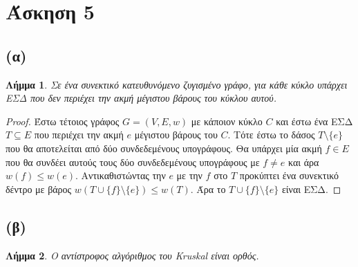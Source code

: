 \documentclass[11pt,a4paper,oneside]{report}
\newtheorem*{lemma}{Λήμμα}
\begin{document}
\section*{Άσκηση 5}
\subsection*{(α)}
\begin{lemma}
Σε ένα συνεκτικό κατευθυνόμενο ζυγισμένο γράφο, για κάθε κύκλο υπάρχει ΕΣΔ που δεν περιέχει την ακμή μέγιστου βάρους του κύκλου αυτού.
\end{lemma}

\begin{proof}
Έστω τέτοιος γράφος $G = (V, E, w)$ με κάποιον κύκλο $C$ και έστω ένα ΕΣΔ $T \subseteq E$ που περιέχει την ακμή $e$ μέγιστου βάρους του $C$. Τότε έστω το δάσος $T \setminus \{ e \}$ που θα αποτελείται από δύο συνδεδεμένους υπογράφους. Θα υπάρχει μία ακμή $f \in E$ που θα συνδέει αυτούς τους δύο συνδεδεμένους υπογράφους με $f \neq e$ και άρα $w( f ) \leq w( e )$. Αντικαθιστώντας την $e$ με την $f$ στο $T$ προκύπτει ένα συνεκτικό δέντρο με βάρος $w( T \cup \{ f \} \setminus \{ e \} ) \leq w( T )$. Άρα το $T \cup \{ f \} \setminus \{ e \}$ είναι ΕΣΔ.
\end{proof}

\subsection*{(β)}
\begin{lemma}
Ο αντίστροφος αλγόριθμος του \textlatin{Kruskal} είναι ορθός.
\end{lemma}
\end{document}
